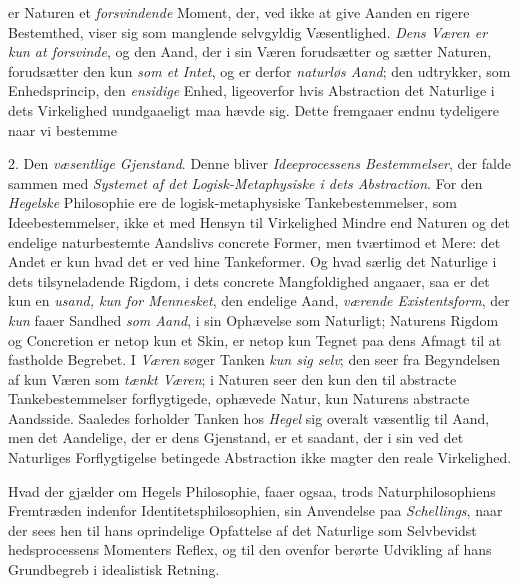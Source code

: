  er Naturen et \emph{forsvindende} Moment, der, ved ikke at give
Aanden en rigere Bestemthed, viser sig som manglende selvgyldig
Væsentlighed. \emph{Dens Væren er kun at forsvinde},
og den Aand, der i sin Væren forudsætter og sætter Naturen,
forudsætter den kun \emph{som et Intet}, og er derfor \emph{naturløs
Aand}; den udtrykker, som Enhedsprincip, den \emph{ensidige} Enhed,
ligeoverfor hvis Abstraction det Naturlige i dets Virkelighed
uundgaaeligt maa hævde sig. Dette fremgaaer endnu
tydeligere naar vi bestemme

2. Den \emph{væsentlige Gjenstand}. Denne bliver \emph{Ideeprocessens
Bestemmelser}, der falde sammen med \emph{Systemet
af det Logisk-Metaphysiske i dets Abstraction}.
For den \emph{Hegelske} Philosophie ere de logisk-metaphysiske
Tankebestemmelser, som Ideebestemmelser, ikke et med
Hensyn til Virkelighed Mindre end Naturen og det endelige
naturbestemte Aandslivs concrete Former, men tværtimod et
Mere: det Andet er kun hvad det er ved hine Tankeformer.
Og hvad særlig det Naturlige i dets tilsyneladende Rigdom, i
dets concrete Mangfoldighed angaaer, saa er det kun en
\emph{usand, kun for Mennesket}, den endelige Aand, \emph{værende
Existentsform}, der \emph{kun} faaer Sandhed \emph{som Aand}, i sin
Ophævelse som Naturligt; Naturens Rigdom og Concretion er
netop kun et Skin, er netop kun Tegnet paa dens Afmagt til
at fastholde Begrebet. I \emph{Væren} søger Tanken \emph{kun sig selv};
den seer fra Begyndelsen af kun Væren som \emph{tænkt Væren};
i Naturen seer den kun den til abstracte Tankebestemmelser
forflygtigede, ophævede Natur, kun Naturens abstracte Aandsside.
Saaledes forholder Tanken hos \emph{Hegel} sig overalt væsentlig
til Aand, men det Aandelige, der er dens Gjenstand,
er et saadant, der i sin ved det Naturliges Forflygtigelse betingede
Abstraction ikke magter den reale Virkelighed.

Hvad der gjælder om Hegels Philosophie, faaer ogsaa,
trods Naturphilosophiens Fremtræden indenfor Identitetsphilosophien,
sin Anvendelse paa \emph{Schellings}, naar der sees hen til
hans oprindelige Opfattelse af det Naturlige som Selvbevidst
 hedsprocessens Momenters Reflex, og til den ovenfor berørte
Udvikling af hans Grundbegreb i idealistisk Retning.


